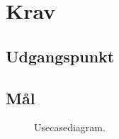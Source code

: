 \chapter{Krav}\label{chap:krav}

\section{Udgangspunkt}\label{sec:krav:kravUdgangspunkt}

\section{Mål}\label{sec:krav:maal}

\begin{figure}
\caption{Usecasediagram.}\label{fig:tikzUseCase}
\centering

\end{figure}